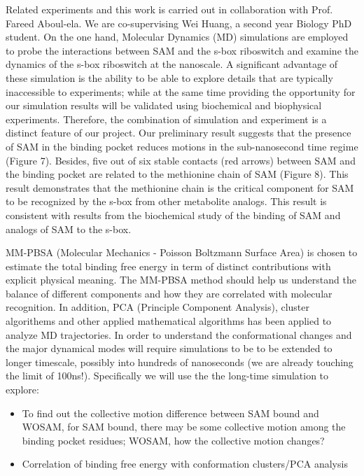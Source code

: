 \documentclass[a4paper,10pt]{article}
\begin{document}
Related experiments and this work is carried out in collaboration with Prof. Fareed Aboul-ela. We are co-supervising Wei Huang, a second year Biology PhD student.
On the one hand, Molecular Dynamics (MD) simulations are employed to probe the interactions between SAM 
and the s-box riboswitch and examine the dynamics of the s-box riboswitch at the nanoscale. A 
significant  
advantage of these simulation is the ability to be able to explore details that are typically inaccessible to experiments; while at the same time providing the opportunity for  
our simulation results will be validated using biochemical and biophysical experiments. Therefore, the 
combination of simulation and experiment is a distinct feature of our project.
Our preliminary result suggests that the presence of SAM in the binding pocket reduces motions in the  sub-nanosecond time regime (Figure 7). Besides, five out of six stable contacts (red arrows) 
between SAM and the binding pocket are related to the methionine chain of SAM (Figure 8). 
This result demonstrates that the methionine chain is the critical component for SAM to be recognized by 
the s-box from other metabolite analogs. This result is consistent with results from the biochemical study 
of the binding of SAM and analogs of SAM to the s-box. 

MM-PBSA (Molecular Mechanics - Poisson Boltzmann Surface Area) is chosen to estimate the total binding free energy in term of distinct contributions with explicit physical
meaning.
The MM-PBSA method should help us understand the balance of different components and how
they are correlated with molecular recognition. In addition, PCA (Principle Component Analysis), cluster
algorithems and other applied mathematical algorithms has been applied to analyze MD trajectories.
In order to understand the conformational changes and the major dynamical
modes will require simulations to be to be extended to longer timescale, possibly into hundreds of 
nanoseconds (we are already touching the limit of 100ns!).
Specifically we will use the the long-time simulation to explore:

\begin{itemize}
\item To find out the collective motion difference between SAM bound and WOSAM, for SAM bound, there 
may be some collective motion among the binding pocket residues; WOSAM, how the collective motion 
changes?
\item Correlation of binding free energy with conformation clusters/PCA analysis
\end{itemize}
\end{document}
